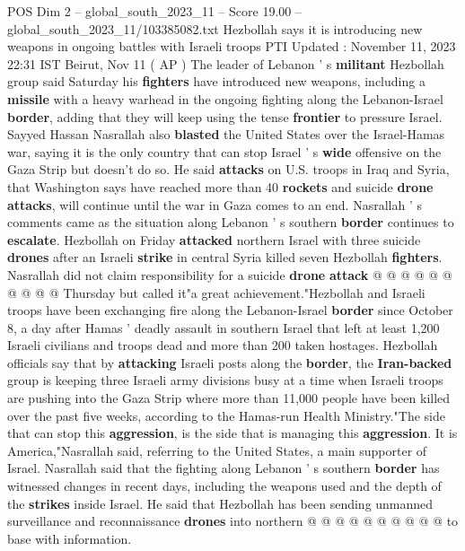 \begin{textsample}{POS Dim 2 – global\_south\_2023\_11 – Score 19.00 – global\_south\_2023\_11/103385082.txt}  \label{ex:f2_pos_220}
Hezbollah says it is introducing new weapons in ongoing battles with Israeli troops PTI Updated : November 11, 2023 22:31 IST Beirut, Nov 11 ( AP ) The leader of Lebanon ' s \textbf{militant} Hezbollah group said Saturday his \textbf{fighters} have introduced new weapons, including a \textbf{missile} with a heavy warhead in the ongoing fighting along the Lebanon-Israel \textbf{border}, adding that they will keep using the tense \textbf{frontier} to pressure Israel.
Sayyed Hassan Nasrallah also \textbf{blasted} the United States over the Israel-Hamas war, saying it is the only country that can stop Israel ' s \textbf{wide} offensive on the Gaza Strip but doesn't do so.
He said \textbf{attacks} on U.S. troops in Iraq and Syria, that Washington says have reached more than 40 \textbf{rockets} and suicide \textbf{drone} \textbf{attacks}, will continue until the war in Gaza comes to an end.
Nasrallah ' s comments came as the situation along Lebanon ' s southern \textbf{border} continues to \textbf{escalate}.
Hezbollah on Friday \textbf{attacked} northern Israel with three suicide \textbf{drones} after an Israeli \textbf{strike} in central Syria killed seven Hezbollah \textbf{fighters}.
Nasrallah did not claim responsibility for a suicide \textbf{drone} \textbf{attack} @ @ @ @ @ @ @ @ @ @ Thursday but called it"a great achievement."Hezbollah and Israeli troops have been exchanging fire along the Lebanon-Israel \textbf{border} since October 8, a day after Hamas ' deadly assault in southern Israel that left at least 1,200 Israeli civilians and troops dead and more than 200 taken hostages.
Hezbollah officials say that by \textbf{attacking} Israeli posts along the \textbf{border}, the \textbf{Iran-backed} group is keeping three Israeli army divisions busy at a time when Israeli troops are pushing into the Gaza Strip where more than 11,000 people have been killed over the past five weeks, according to the Hamas-run Health Ministry."The side that can stop this \textbf{aggression}, is the side that is managing this \textbf{aggression}.
It is America,"Nasrallah said, referring to the United States, a main supporter of Israel.
Nasrallah said that the fighting along Lebanon ' s southern \textbf{border} has witnessed changes in recent days, including the weapons used and the depth of the \textbf{strikes} inside Israel.
He said that Hezbollah has been sending unmanned surveillance and reconnaissance \textbf{drones} into northern @ @ @ @ @ @ @ @ @ @ to base with information.

\end{textsample}
